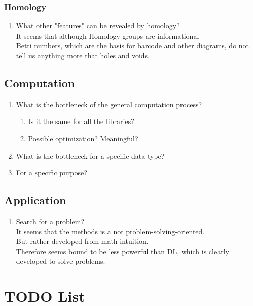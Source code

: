 \documentclass[10pt,a4paper]{article}
\begin{document}
\subsubsection{Homology}
\begin{enumerate}
	\item What other "features" can be revealed by homology?\\
		  It seems that although Homology groups are informational\\
		  Betti numbers, which are the basis for barcode and other diagrams, do not tell us anything more that holes and voids.\\
		  
\end{enumerate}
\subsection{Computation}
\begin{enumerate}
	\item What is the bottleneck of the general computation process?
	\begin{enumerate}
		\item Is it the same for all the libraries?
		\item Possible optimization? Meaningful?
	\end{enumerate}	  
	\item What is the bottleneck for a specific data type?
	\item For a specific purpose?
\end{enumerate}
\subsection{Application}
\begin{enumerate}
	\item Search for a problem?\\
		  It seems that the methods is a not problem-solving-oriented.\\
		  But rather developed from math intuition.\\
		  Therefore seems bound to be less powerful than DL, which is clearly developed to solve problems.\\
		  
\end{enumerate}

\section{TODO List}
\end{document}
